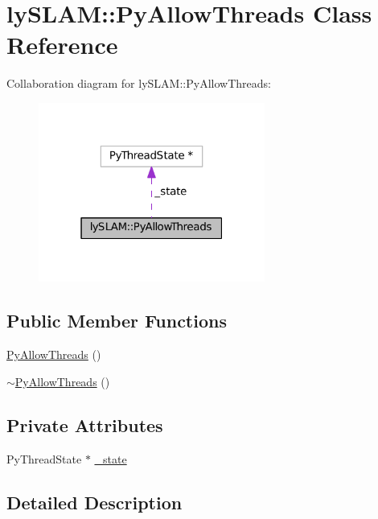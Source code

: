 \hypertarget{classlySLAM_1_1PyAllowThreads}{}\section{ly\+S\+L\+AM\+:\+:Py\+Allow\+Threads Class Reference}
\label{classlySLAM_1_1PyAllowThreads}


Collaboration diagram for ly\+S\+L\+AM\+:\+:Py\+Allow\+Threads\+:\nopagebreak
\begin{figure}[H]
\begin{center}
\leavevmode
\includegraphics[width=211pt]{classlySLAM_1_1PyAllowThreads__coll__graph}
\end{center}
\end{figure}
\subsection*{Public Member Functions}
\begin{DoxyCompactItemize}
\item 
\hyperlink{classlySLAM_1_1PyAllowThreads_ab8568add3eada88f40c00d1b5b30b0ad}{Py\+Allow\+Threads} ()
\item 
\hyperlink{classlySLAM_1_1PyAllowThreads_adcdfe6fcc17c17aa09079691e055bd9d}{$\sim$\+Py\+Allow\+Threads} ()
\end{DoxyCompactItemize}
\subsection*{Private Attributes}
\begin{DoxyCompactItemize}
\item 
Py\+Thread\+State $\ast$ \hyperlink{classlySLAM_1_1PyAllowThreads_ac8076cd04c356e648d9ae5e28cd0d4aa}{\+\_\+state}
\end{DoxyCompactItemize}


\subsection{Detailed Description}


